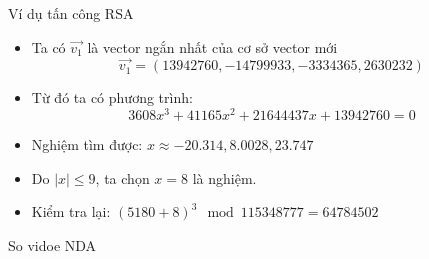 \begin{frame}{Ví dụ tấn công RSA}

\begin{itemize}
\item Ta có $\vec{v_1}$ là vector ngắn nhất của cơ sở vector mới
\[
\vec{v_1} = (13942760, -14799933, -3334365, 2630232)
\]
\item Từ đó ta có phương trình:
\[
3608x^3 + 41165x^2 + 21644437x + 13942760 = 0
\]
\item Nghiệm tìm được: $x \approx -20.314, 8.0028, 23.747$
\item Do   $|x| \leq 9$, ta chọn $x = 8$ là nghiệm.
 \item Kiểm tra lại: $(5180+8)^3 \mod 115348777 = 64784502$  
\end{itemize}





\end{frame}



So vidoe
NDA
